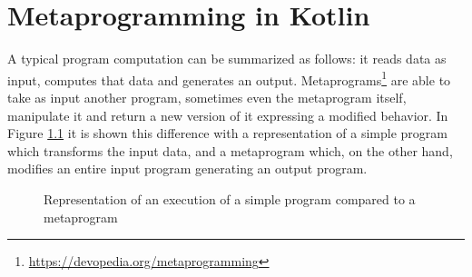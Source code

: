 \chapter{Metaprogramming in Kotlin}\label{chapter:metaprogramming}
A typical program computation can be summarized as follows: it reads data as input, computes that data and generates an output.\newline
Metaprograms\footnote{\url{https://devopedia.org/metaprogramming}} are able to take as input another program, sometimes even the metaprogram itself, manipulate it and return a new version of it expressing a modified behavior.\newline 
In Figure \ref{fig:programming_vs_metaprogramming} it is shown this difference with a representation of a simple program which transforms the input data, and a metaprogram which, on the other hand, modifies an entire input program generating an output program.
\begin{figure}[ht!]
    \centering
    \qquad
    \caption{Representation of an execution of a simple program compared to a metaprogram}
    \label{fig:programming_vs_metaprogramming}
\end{figure}

